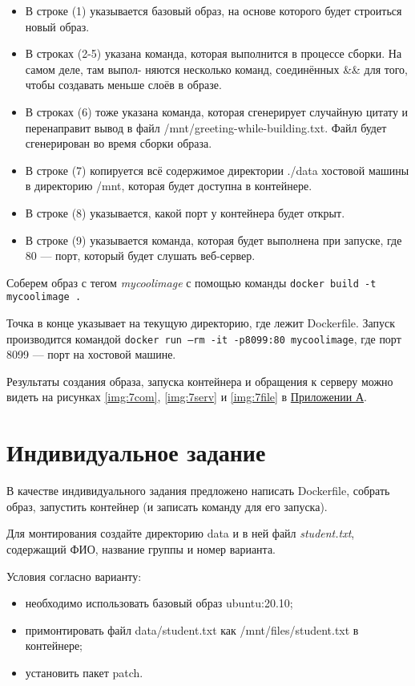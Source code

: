 \documentclass[a4paper,14pt]{extarticle}
\begin{document}

\begin{itemize}
	\item В строке (1) указывается базовый образ, на основе которого будет строиться новый образ.
	\item В строках (2-5) указана команда, которая выполнится в процессе сборки. На самом деле, там выпол-
няются несколько команд, соединённых \&\& для того, чтобы создавать меньше слоёв в образе.
	\item В строках (6) тоже указана команда, которая сгенерирует случайную цитату и перенаправит вывод в
файл /mnt/greeting-while-building.txt. Файл будет сгенерирован во время сборки образа.
	\item В строке (7) копируется всё содержимое директории ./data хостовой машины в директорию /mnt,
которая будет доступна в контейнере.
	\item В строке (8) указывается, какой порт у контейнера будет открыт.
	\item В строке (9) указывается команда, которая будет выполнена при запуске, где 80 — порт, который будет
слушать веб-сервер.
\end{itemize}

Соберем образ с тегом \textit{mycoolimage} с помощью команды \texttt{docker build -t mycoolimage .}

Точка в
конце указывает на текущую директорию, где лежит Dockerfile.
Запуск производится командой \texttt{docker run --rm -it -p8099:80 mycoolimage}, где порт 8099 — порт на хостовой машине.

Результаты создания образа, запуска контейнера и обращения к серверу можно видеть на рисунках \ref{img:7com}, \ref{img:7serv} и \ref{img:7file} в \hyperref[A]{Приложении А}.

\section{Индивидуальное задание}
В качестве индивидуального задания предложено написать Dockerfile, собрать образ, запустить контейнер (и записать команду для его запуска). 

Для монтирования создайте директорию data и в ней файл \textit{student.txt}, содержащий ФИО, название группы и номер варианта.

Условия согласно варианту:
\begin{itemize}
	\item необходимо использовать базовый образ ubuntu:20.10;
	\item примонтировать файл data/student.txt как /mnt/files/student.txt в контейнере;
	\item установить пакет patch.
\end{itemize}
\end{document}
